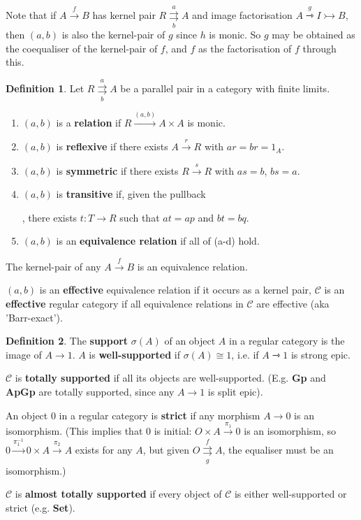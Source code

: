 \documentclass[a4paper]{article}
\theoremstyle{definition}
\newtheorem{definition}{Definition}
\theoremstyle{remark}
\theoremstyle{default}
\numberwithin{definition}{section}
\newcommand*\parallelpair[2]{\overset{#1}{\underset{#2}{\rightrightarrows}}}
\begin{document}
Note that if $A \overset{f}{\to} B$ has kernel pair $R \parallelpair{a}{b} A$ and image factorisation
$A \overset{g}{\rightarrowtriangle} I \rightarrowtail B$,
then $(a, b)$ is also the kernel-pair of $g$ since $h$ is monic.
So $g$ may be obtained as the coequaliser of the kernel-pair of $f$,
and $f$ as the factorisation of $f$ through this.

\begin{definition}
	Let $R \parallelpair{a}{b} A$ be a parallel pair in a category with finite limits.
	\begin{enumerate}[label=\alph*.]
		\item $(a, b)$ is a \textbf{relation} if $R \overset{(a,b)}{\longrightarrow} A \times A$ is monic.
		\item $(a,b)$ is \textbf{reflexive} if there exists $A \overset{r}{\to} R$ with $ar = br = 1_A$.
		\item $(a, b)$ is \textbf{symmetric} if there exists $R \overset{s}{\to} R$ with $as = b$, $bs = a$.
		\item $(a, b)$ is \textbf{transitive} if, given the pullback
			,
			there exists $t: T \to R$ such that $at = ap$ and $bt = bq$.
		\item $(a, b)$ is an \textbf{equivalence relation} if all of (a-d) hold.	
	\end{enumerate}
	The kernel-pair of any $A \overset{f}{\to} B$ is an equivalence relation.
	
	$(a, b)$ is an \textbf{effective} equivalence relation if it occurs as a kernel pair,
	$\mathcal{C}$ is an \textbf{effective} regular category if all equivalence relations in $\mathcal{C}$ are effective (aka 'Barr-exact').	
\end{definition}

\begin{definition}
	The \textbf{support} $\sigma(A)$ of an object $A$ in a regular category is the image of $A \to 1$.
	$A$ is \textbf{well-supported} if $\sigma(A) \cong 1$,
	i.e. if $A \rightarrowtriangle 1$ is strong epic.
	
	$\mathcal{C}$ is \textbf{totally supported} if all its objects are well-supported.
	(E.g. \textbf{Gp} and \textbf{ApGp} are totally supported,
	since any $A \to 1$ is split epic).
	
	An object $0$ in a regular category is \textbf{strict} if any morphism $A \to 0$ is an isomorphism.
	(This implies that $0$ is initial: $O \times A \overset{\pi_1}{\to} 0$ is an isomorphism,
	so $0 \overset{\pi_1^{-1}}{\to} 0 \times A \overset{\pi_2}{\to} A$ exists for any $A$,
	but given $O \parallelpair{f}{g} A$,
	the equaliser must be an isomorphism.)
	
	$\mathcal{C}$ is \textbf{almost totally supported} if every object of $\mathcal{C}$ is either well-supported or strict (e.g. \textbf{Set}).
\end{definition}
\end{document}
